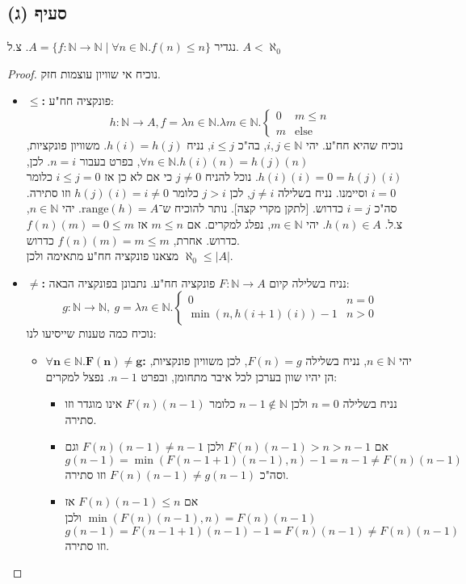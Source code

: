 \documentclass[]{article}
\newcommand\N     {\mathbb{N}}
\newcommand\other {\text{else}}
\newcommand\range {\text{range}}
\newcommand\az    {\aleph_0}
\begin{document}
	\subsection*{סעיף (ג)}
	נגדיר $ A = \{f \colon \N \to \N \mid \forall n \in \N. f(n) \le n\} $. צ.ל. $ A < \az $
	\begin{proof} נוכיח אי שוויון עוצמות חזק. 
	\begin{itemize}
		\item $ \bm{\le} $\textbf{: }פונקציה חח"ע: 
		\[h \colon \N \to A, f = \lambda n \in \N. \lambda m \in \N. \begin{cases}
			0 &m \le n \\
			m &\other
		\end{cases} \]
	נוכיח שהיא חח"ע. יהי $ i, j \in \N $, בה"כ $ i \le j $, נניח $ h(i) = h(j) $. משוויון פונקציות, $ \forall n \in \N. h(i)(n) = h(j)(n) $, בפרט בעבור $ n = i $. לכן, $ h(i)(i) = 0 = h(j)(i) $. נוכל להניח $ j \neq 0 $ כי אם לא כן אז $ i \le j = 0 $ כלומר $ i = 0 $ וסיימנו. נניח בשלילה $ j \neq i $, לכן $ j > i $ כלומר $ h(j)(i) = i \neq 0 $ וזו סתירה. סה"כ $ i = j $ כדרוש. [לתקן מקרי קצה]. נותר להוכיח ש־$ \range(h) = A $. יהי $ n \in \N $, צ.ל. $ h(n) \in A $. יהי $ m \in \N $, נפלג למקרים. אם $ m \le n $ אז $ f(n)(m) = 0 \le m $ כדרוש. אחרת, $ f(n)(m) = m \le m $ כדרוש. \\
	מצאנו פונקציה חח"ע מתאימה ולכן $ \az \le |A| $. 
		\item $ \bm{\neq} $\textbf{: }נניח בשלילה קיום $ F \colon \N \to A $ פונקציה חח"ע. נתבונן בפונקציה הבאה: 
		\[ g \colon \N \to \N, \ g = \lambda n \in \N. \begin{cases}
			0 & n = 0 \\
			\min(n, h(i + 1)(i)) - 1 & n > 0
		\end{cases} \]
		נוכיח כמה טענות שייסיעו לנו: 
		\begin{itemize}
			\item $ \bm{\forall n \in \N. F(n) \neq g} $\textbf{: }יהי $ n \in \N $, נניח בשלילה $ F(n) = g $, לכן משוויון פונקציות, הן יהיו שוון בערכן לכל איבר מתחומן, ובפרט $ n - 1 $. נפצל למקרים: 
			\begin{itemize}
				\item נניח בשלילה $ n = 0 $ ולכן $ n - 1 \not\in \N $ כלומר $ F(n)(n - 1) $ אינו מוגדר וזו סתירה. 
				\item אם $ F(n)(n - 1) > n > n - 1 $ ולכן $ F(n)(n - 1) \neq n - 1 $ וגם $ g(n - 1) = \min(F(n - 1 + 1)(n - 1), n) - 1 = n - 1 \neq F(n)(n - 1) $ וסה"כ $ F(n)(n - 1) \neq g(n - 1) $ וזו סתירה. 
				\item אם $ F(n)(n - 1) \le n $ אז $ \min(F(n)(n - 1), n) = F(n)(n - 1) $ ולכן $ g(n -1) = F(n - 1 + 1)(n - 1) - 1 = F(n)(n - 1) \neq F(n)(n - 1) $ וזו סתירה.

\end{itemize}
\end{itemize}
\end{itemize}
\end{proof}
\end{document}

